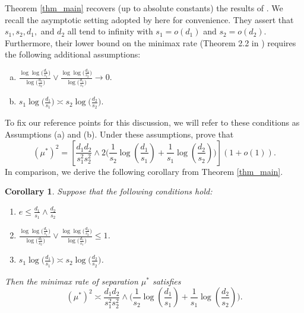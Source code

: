 \documentclass{article}
\newtheorem{corollary}{Corollary}
\theoremstyle{remark}
\begin{document}
    Theorem \ref{thm_main} recovers (up to absolute constants) the results of \cite{butucea2013detection}. We recall the asymptotic setting adopted by \cite{butucea2013detection} here for convenience. They assert that $s_1, s_2, d_1,$ and $d_2$ all tend to infinity with $s_1 = o(d_1)$ and $s_2 = o(d_2)$. Furthermore, their lower bound on the minimax rate (Theorem 2.2 in \cite{butucea2013detection}) requires the following additional assumptions:
    \begin{enumerate}[(a)]
        \item $\frac{\log \log\big( \frac{d_1}{s_1}\big)}{\log \big(\frac{d_2}{s_2}\big)} \lor \frac{\log \log\big( \frac{d_2}{s_2}\big)}{\log \big(\frac{d_1}{s_1}\big)} \rightarrow 0$.
        \item $s_1 \log \big(\frac{d_1}{s_1}\big) \asymp s_2 \log \big(\frac{d_2}{s_2}\big)$.
    \end{enumerate}
    To fix our reference points for this discussion, we will refer to these conditions as Assumptions (a) and (b). Under these assumptions, \cite{butucea2013detection} prove that
    \begin{equation}\label{eq_bi_rate}
        (\mu^*)^2 = \left[\frac{d_1d_2}{s_1^2s_2^2} \land 2 \Bigg(\frac{1}{s_2}\log\left(\frac{d_1}{s_1}\right) + \frac{1}{s_1}\log\left(\frac{d_2}{s_2}\right)\Bigg)\right](1+o(1)).
    \end{equation}
    In comparison, we derive the following corollary from Theorem \ref{thm_main}.
    \begin{corollary}\label{cor_match_bi}
        Suppose that the following conditions hold:
        \begin{enumerate}
        \item $e \leq \frac{d_1}{s_1} \land \frac{d_2}{s_2}$
        \item $\frac{\log \log\big( \frac{d_1}{s_1}\big)}{\log \big(\frac{d_2}{s_2}\big)} \lor \frac{\log \log\big( \frac{d_2}{s_2}\big)}{\log \big(\frac{d_1}{s_1}\big)} \leq 1$.
        \item $s_1 \log \big(\frac{d_1}{s_1}\big) \asymp s_2 \log \big(\frac{d_2}{s_2}\big)$.
    \end{enumerate}
        Then the minimax rate of separation $\mu^*$ satisfies
        \begin{equation}
            (\mu^*)^2 \asymp \frac{d_1d_2}{s_1^2s_2^2} \land \Bigg(\frac{1}{s_2}\log\left(\frac{d_1}{s_1}\right) + \frac{1}{s_1}\log\left(\frac{d_2}{s_2}\right)\Bigg).
        \end{equation}
    \end{corollary}    
\end{document}
